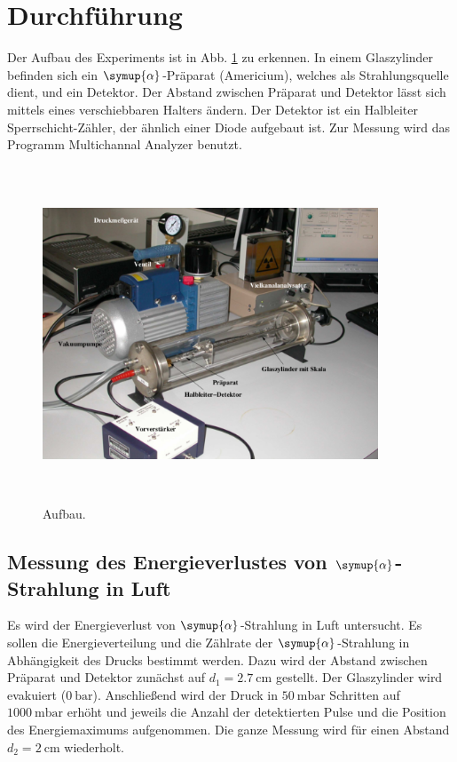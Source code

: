 \section{Durchführung}
\label{sec:Durchführung}

Der Aufbau des Experiments ist in Abb. \ref{fig:aufbau} zu erkennen. In einem Glaszylinder befinden sich ein $\symup{\alpha}$-Präparat (Americium), welches als Strahlungsquelle dient, und ein Detektor. Der Abstand zwischen Präparat und Detektor lässt sich mittels eines verschiebbaren Halters ändern. Der Detektor ist ein Halbleiter Sperrschicht-Zähler, der ähnlich einer Diode aufgebaut ist. 
Zur Messung wird das Programm Multichannal Analyzer benutzt. 

\begin{figure}
    \centering
    \includegraphics[width=10cm, height=10cm]{build/aufbau.png}
    \caption{Aufbau. \cite{V701}}
    \label{fig:aufbau}
\end{figure}

\subsection{Messung des Energieverlustes von $\symup{\alpha}$-Strahlung in Luft}
Es wird der Energieverlust von $\symup{\alpha}$-Strahlung in Luft untersucht.
Es sollen die Energieverteilung und die Zählrate der $\symup{\alpha}$-Strahlung in Abhängigkeit des Drucks bestimmt werden.
\newline
Dazu wird der Abstand zwischen Präparat und Detektor zunächst auf $d_1 = \SI{2.7}{\centi\meter}$ gestellt. Der Glaszylinder wird evakuiert ($\SI{0}{\bar}$). Anschließend wird der Druck in $\SI{50}{\milli\bar}$ Schritten auf $\SI{1000}{\milli\bar}$ erhöht und jeweils die Anzahl der detektierten Pulse und die Position des Energiemaximums aufgenommen.
\newline
Die ganze Messung wird für einen Abstand $d_2 = \SI{2}{\centi\meter}$ wiederholt.

